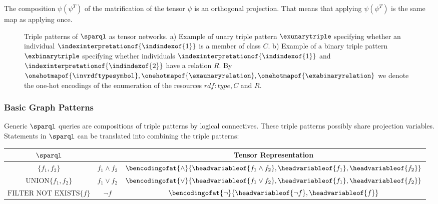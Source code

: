 The composition $\psi (\psi^T)$ of the matrification of the tensor $\psi$ is an orthogonal projection.
That means that applying $\psi (\psi^T)$ is the same map as applying once.


\begin{figure}[t]
    \begin{center}
        
    \end{center}
    \caption{Triple patterns of $\sparql$ as tensor networks.
    a) Example of unary triple pattern $\exunarytriple$ specifying whether an individual $\indexinterpretationof{\indindexof{1}}$ is a member of class $C$.
    b) Example of a binary triple pattern $\exbinarytriple$ specifying whether individuals $\indexinterpretationof{\indindexof{1}}$ and $\indexinterpretationof{\indindexof{2}}$ have a relation $R$.
    By $\onehotmapof{\invrdftypesymbol},\onehotmapof{\exaunaryrelation},\onehotmapof{\exabinaryrelation}$ we denote the one-hot encodings of the enumeration of the resources $rdf:type, C$ and $R$.
    }
    \label{fig:triplePatterns}
\end{figure}




\subsubsection{Basic Graph Patterns}

Generic $\sparql$ queries are compositions of triple patterns by logical connectives. %
These triple patterns possibly share projection variables.
Statements in $\sparql$ can be translated into \propositionalLogic{} combining the triple patterns:
\begin{center}
    \begin{tabular}{|c|c|c|}
        \hline
        \textbf{$\sparql$}                                        & \textbf{\PropositionalLogic{}} & \textbf{Tensor Representation}                                                                   \\
        \hline
        $\{f_1, f_2\}$                                            & $f_1\land f_2$                 & $\bencodingofat{\land}{\headvariableof{f_1\land f_2},\headvariableof{f_1},\headvariableof{f_2}}$ \\
        \hline
        $\mathrm{UNION}\{f_1, f_2\} $                             & $f_1\lor f_2$                  & $\bencodingofat{\lor}{\headvariableof{f_1\lor f_2},\headvariableof{f_1},\headvariableof{f_2}}$   \\
        \hline
        $\mathrm{FILTER}\,\,\mathrm{NOT}\,\,\mathrm{EXISTS}\{f\}$ & $\lnot f$                      & $\bencodingofat{\lnot}{\headvariableof{\lnot f},\headvariableof{f}}$                             \\
        \hline
    \end{tabular}
\end{center}

